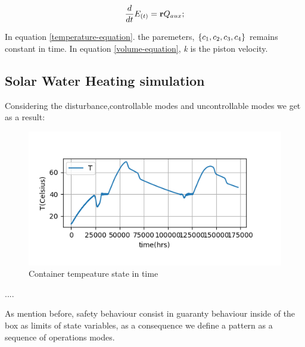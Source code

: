 \documentclass[conference]{IEEEtran}
\begin{document}
\begin{equation} 
\frac{d}{dt}\energy =  \textbf{r}  \auxheat ;
\label{Energy-equation}
\end{equation}

In equation \ref{temperature-equation}. the paremeters,  $\left\lbrace 
c_1, c_{2}, c_{3}, c_{4} \right\rbrace $ 
remains constant in time. In equation \ref{volume-equation}, 
\emph{k} is the piston velocity.


\subsection{Solar Water Heating simulation}\label{AA}

Considering the disturbance,controllable modes and uncontrollable modes we get 
as a result:

\begin{figure}[h]  %
\includegraphics[scale = 0.5]{1}
\caption{Container tempeature state in time}
\centering
\end{figure}
....





As mention before, safety behaviour consist in guaranty behaviour
inside of the box as limits of state variables, as a consequence
we define a pattern as a sequence of operations modes.
\end{document}
